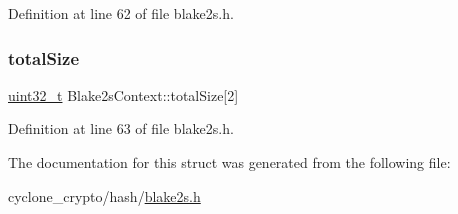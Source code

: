 Definition at line 62 of file blake2s.\+h.

\mbox{\label{structBlake2sContext_a8db8eadcbe516527d006ef965f5f2245}} 
\subsubsection{\texorpdfstring{total\+Size}{totalSize}}
{\footnotesize\ttfamily \hyperlink{stdint_8h_a435d1572bf3f880d55459d9805097f62}{uint32\+\_\+t} Blake2s\+Context\+::total\+Size\mbox{[}2\mbox{]}}



Definition at line 63 of file blake2s.\+h.



The documentation for this struct was generated from the following file\+:\begin{DoxyCompactItemize}
\item 
cyclone\+\_\+crypto/hash/\hyperlink{blake2s_8h}{blake2s.\+h}\end{DoxyCompactItemize}
